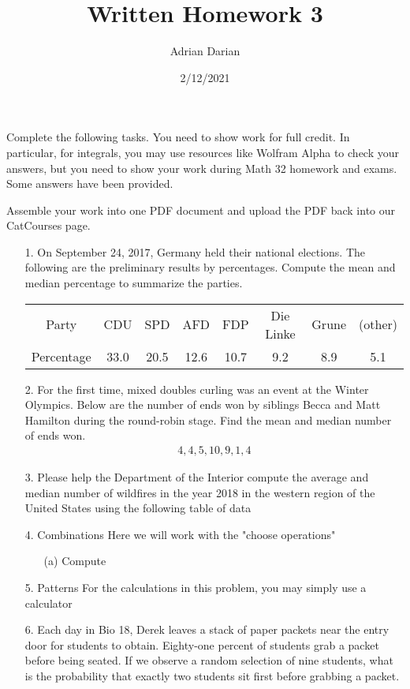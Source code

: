 \documentclass[a4paper]{article}
\title{Written Homework 3}
\author{Adrian Darian}
\date{2/12/2021}
\begin{document}
  
\maketitle
  
Complete the following tasks. You need to show work for full credit. In particular, for integrals, you may use resources like Wolfram Alpha to check your answers, but you need to show your work during Math 32 homework and exams. Some answers have been provided. 

Assemble your work into one PDF document and upload the PDF back into our CatCourses page.

\begin{itemize}
	\item[1.]  On September 24, 2017, Germany held their national elections. The following are the preliminary results by percentages. Compute the mean and median percentage to summarize the parties.
	      \begin{tabular}{|c|c|c|c|c|c|c|c|}
	      	Party      & CDU  & SPD  & AFD  & FDP  & Die Linke & Grune & (other) \\
	      	Percentage & 33.0 & 20.5 & 12.6 & 10.7 & 9.2       & 8.9   & 5.1     \\
	      \end{tabular}
	\item[2.] For the first time, mixed doubles curling was an event at the Winter Olympics. Below are the number of ends won by siblings Becca and Matt Hamilton during the round-robin stage. Find the mean and median number of ends won.
	      \begin{equation}
	      	\begin{split}
	      		            4, 4, 5, 10, 9, 1, 4
	      	\end{split}
	      \end{equation}
	\item[3.] Please help the Department of the Interior compute the average and median number of wildfires in the year 2018 in the western region of the United States using the following table of data
	\item[4.] Combinations Here we will work with the "choose operations"
	\begin{itemize}
		\item[(a)] Compute 
	\end{itemize} 
	\item[5.] Patterns For the calculations in this problem, you may simply use a calculator 
	\item[6.] Each day in Bio 18, Derek leaves a stack of paper packets near the entry door for students to obtain. Eighty-one percent of students grab a packet before being seated. If we observe a random selection of nine students, what is the probability that exactly two students sit first before grabbing a packet.

\end{itemize}
\end{document}
